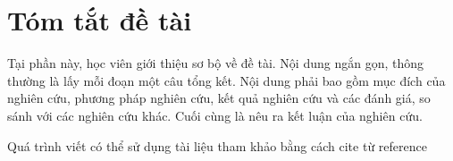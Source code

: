 \section{Tóm tắt đề tài}
\label{summary}

Tại phần này, học viên giới thiệu sơ bộ về đề tài. Nội dung ngắn gọn, thông thường là lấy mỗi đoạn một câu tổng kết. Nội dung phải bao gồm mục đích của nghiên cứu, phương pháp nghiên cứu, kết quả nghiên cứu và các đánh giá, so sánh với các nghiên cứu khác. Cuối cùng là nêu ra kết luận của nghiên cứu.

Quá trình viết có thể sử dụng tài liệu tham khảo bằng cách cite từ reference \cite{vladimir2021cloudcomputing}